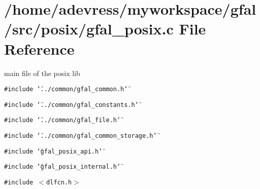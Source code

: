\section{/home/adevress/myworkspace/gfal/src/posix/gfal\_\-posix.c File Reference}
\label{gfal__posix_8c}
main file of the posix lib 

{\tt \#include \char`\"{}../common/gfal\_\-common.h\char`\"{}}\par
{\tt \#include \char`\"{}../common/gfal\_\-constants.h\char`\"{}}\par
{\tt \#include \char`\"{}../common/gfal\_\-file.h\char`\"{}}\par
{\tt \#include \char`\"{}../common/gfal\_\-common\_\-storage.h\char`\"{}}\par
{\tt \#include \char`\"{}gfal\_\-posix\_\-api.h\char`\"{}}\par
{\tt \#include \char`\"{}gfal\_\-posix\_\-internal.h\char`\"{}}\par
{\tt \#include $<$dlfcn.h$>$}\par
